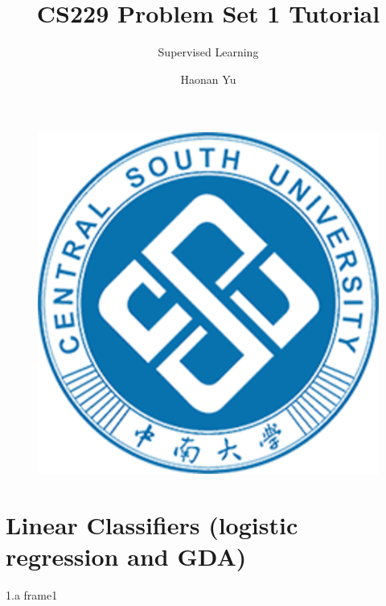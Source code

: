 \documentclass{beamer}
\author{Haonan Yu}
\title{CS229 Problem Set 1 Tutorial}
\subtitle{Supervised Learning}
\institute{中南大学能源学院}
\begin{document}
\kaishu
\begin{frame}
    \titlepage
    \begin{figure}[htpb]
        \begin{center}
            \includegraphics[width=0.2\linewidth]{pic/Central_South_University_Logo.eps}
        \end{center}
    \end{figure}
\end{frame}



\section{Linear Classifiers (logistic regression and GDA)}

\begin{frame}{1.a}
    frame1
\end{frame}
\end{document}
